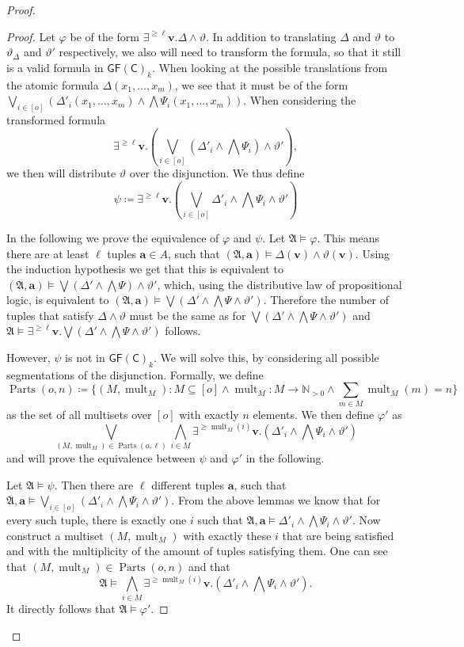 \documentclass[a4paper,11pt,DIV=15]{scrartcl} %
\renewcommand{\phi}{\varphi}
\theoremstyle{plain}
\theoremstyle{definition}
\newcommand{\GFC}{\mathsf{GF}(\mathsf{C})}
\renewcommand{\theta}{\vartheta}
\begin{document}
\begin{proof}
\begin{proof}
		Let $\phi$ be of the form $\exists^{\geq\ell}\mathbf v. \Delta\land \theta$.
		In addition to translating $\Delta$ and $\theta$ to $\theta_\Delta$ and $\theta'$ respectively, we also will need to transform the formula, so that it still is a valid formula in $\GFC_k$.
		When looking at the possible translations from the atomic formula $\Delta(x_1,\dots,x_m)$, we see that it must be of the form $\bigvee_{i\in[o]} (\Delta'_i(x_1,\dots,x_m) \land \bigwedge \Psi_i(x_1,\dots,x_m))$.
		When considering the transformed formula 
		$$\exists^{\geq \ell}\mathbf v. \left(\bigvee_{i\in [o]}(\Delta'_i\land\bigwedge \Psi_i) \land \theta'\right),$$
		we then will distribute $\theta$ over the disjunction.
		We thus define
		$$\psi \coloneqq \exists^{\geq \ell}\mathbf v. \left(\bigvee_{i\in[o]} \Delta'_i\land\bigwedge \Psi_i \land \theta'\right)$$
		
		In the following we prove the equivalence of $\phi$ and $\psi$.
		Let $\mathfrak A\models \phi$.
		This means there are at least $\ell$ tuples $\mathbf a\in A$, such that $(\mathfrak A,\mathbf a)\models \Delta(\mathbf v) \land \theta(\mathbf v)$.
		Using the induction hypothesis we get that this is equivalent to $(\mathfrak A,\mathbf a)\models \bigvee(\Delta'\land\bigwedge\Psi)\land \theta'$, which, using the distributive law of propositional logic, is equivalent to $(\mathfrak A,\mathbf a)\models \bigvee(\Delta'\land\bigwedge\Psi\land\theta')$.
		Therefore the number of tuples that satisfy $\Delta\land\theta$ must be the same as for $\bigvee(\Delta'\land\bigwedge\Psi\land\theta')$ and $\mathfrak A\models \exists^{\geq\ell}\mathbf v. \bigvee (\Delta'\land\bigwedge\Psi\land\theta')$ follows.
		
		However, $\psi$ is not in $\GFC_k$.
		We will solve this, by considering all possible segmentations of the disjunction.
		Formally, we define 
		$$\operatorname{Parts}(o, n)\coloneqq \{(M, \operatorname{mult}_M) : M\subseteq [o] \land \operatorname{mult}_M : M \to \mathbb{N}_{>0} \land \sum_{m\in M} \operatorname{mult}_M(m) = n\}$$
		as the set of all multisets over $[o]$ with exactly $n$ elements.
		We then define $\phi'$ as
		$$\bigvee_{(M,\operatorname{mult}_M)\in \operatorname{Parts}(o,\ell)} \bigwedge_{i\in M} \exists^{\geq \operatorname{mult}_M(i)}\mathbf v. (\Delta'_i\land\bigwedge \Psi_i \land \theta')$$
		and will prove the equivalence between $\psi$ and $\phi'$ in the following. 
		
		Let $\mathfrak A\models \psi$.
		Then there are $\ell$ different tuples $\mathbf a$, such that $\mathfrak A,\mathbf a \models \bigvee_{i\in[o]}(\Delta'_i\land\bigwedge\Psi_i\land\theta')$.
		From the above lemmas we know that for every such tuple, there is exactly one $i$ such that $\mathfrak A,\mathbf a\models \Delta'_i\land\bigwedge \Psi_i\land \theta'$.
		Now construct a multiset $(M,\operatorname{mult}_M)$ with exactly these $i$ that are being satisfied and with the multiplicity of the amount of tuples satisfying them.
		One can see that $(M,\operatorname{mult}_M)\in \operatorname{Parts}(o,n)$ and that 
		$$\mathfrak A \models \bigwedge_{i\in M}\exists^{\geq\operatorname{mult}_M(i)}\mathbf v. (\Delta'_i\land \bigwedge\Psi_i\land \theta').$$
		It directly follows that $\mathfrak A\models \phi'$.
		

\end{proof}
\end{proof}
\end{document}
